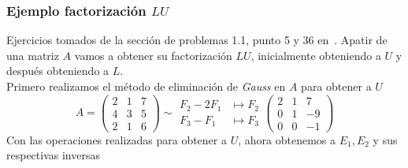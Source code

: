     \subsubsection*{Ejemplo factorización \(LU\)}
    Ejercicios tomados de la sección de problemas 1.1, punto 5 y 36 en~\cite{grossman}.
    Apatir de una matriz \(A\) vamos a obtener su factorización \(LU\), inicialmente obteniendo a \(U\) y después obteniendo a \(L\). \\
    Primero realizamos el método de eliminación de \emph{Gauss} en \(A\) para obtener a \(U\)
    \[
        A = 
        \begin{pmatrix}
            2 & 1 & 7 \\
            4 & 3 & 5 \\ 
            2 & 1 & 6 
        \end{pmatrix}
        \sim
        \begin{aligned}
            F_2 - 2F_1 &\mapsto F_2 \\
            F_3 - F_1 &\mapsto F_3
        \end{aligned}
        \begin{pmatrix}
            2 & 1 & 7 \\
            0 & 1 & -9 \\ 
            0 & 0 & -1 
        \end{pmatrix}
    \]
    Con las operaciones realizadas para obtener a \(U\), ahora obtenemos a \(E_1, E_2\) y sus respectivas inversas
